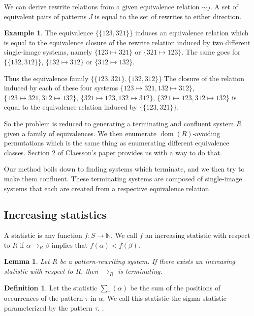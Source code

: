 \documentclass[a4paper, 11pt, english]{article}
\newcommand{\patternrule}{ \mapsto \!}
\newtheorem{lemma}[theorem]{Lemma}
\theoremstyle{definition}
\newtheorem{definition}[theorem]{Definition}
\newtheorem{example}[theorem]{Example}
\newcommand{\Sym}{S}
\DeclareMathOperator{\dom}{dom}
\begin{document}
We can derive rewrite relations from a given equivalence relation $\sim_J$.
A set of equivalent pairs of patterns $J$ is equal to the set of rewrites to
either direction. 
\begin{example}
    The equivalence $\{ \{123, 321 \} \}$ induces an equivalence relation which is
    equal to the equivalence closure of the rewrite relation induced by two
    different single-image systems, namely $\{123 \patternrule 321\}$ or $\{321
    \patternrule 123\}$. The same goes for $\{ \{ 132, 312 \} \}$, $\{132 \patternrule
    312\}$ or $\{312 \patternrule 132\}$.

    Thus the equivalence family $\{ \{ 123, 321 \}, \{ 132, 312 \} \}$ 
    The closure of the relation induced by each of these four systems $\{123 \patternrule 321, 132 \patternrule 312\}$, $\{123 \patternrule 321,
    312 \patternrule 132\}$, $\{321 \patternrule 123, 132 \patternrule 312\}$,
    $\{321 \patternrule 123, 312 \patternrule 132\}$ is equal to the equivalence
    relation induced by $\{ \{ 123, 321 \} \}$.
\end{example}

So the problem is reduced to generating a terminating and confluent system $R$
given a family of equivalences. We then enumerate $\dom(R)$-avoiding
permutations which is the same thing as enumerating different equivalence
classes.  Section 2 of Claesson's paper provides us with a way to do that.
\cite{claesson:2021}

Our method boils down to finding systems which terminate, and we then try to
make them confluent.  These terminating systems are composed of single-image
systems that each are created from a respective equivalence relation.

\subsection{Increasing statistics}
A statistic is any function $f : \Sym \to \mathbb{N}$. We call $f$ an increasing
statistic with respect to $R$ if $\alpha \to_R \beta$ implies that $f(\alpha) < f(\beta)$.

\begin{lemma}
    Let $R$ be a pattern-rewriting system. If there exists an increasing
    statistic with respect to $R$, then $\to_R$ is terminating.    
\end{lemma}

\begin{definition}
    Let the statistic $\sum_\tau(\alpha)$ be the sum of the positions of occurrences of
    the pattern $\tau$ in $\alpha$. We call this statistic the sigma statistic
    parameterized by the pattern $\tau$.
    \cite{claesson:2021}.
\end{definition}
\end{document}
